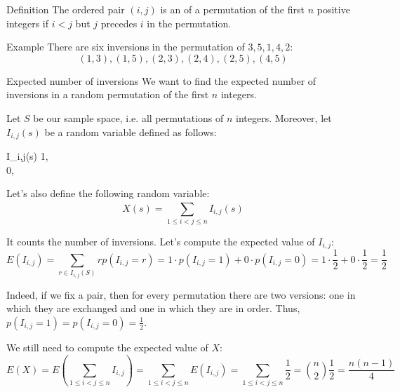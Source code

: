 \documentclass[a4paper]{article}
\begin{document}
\begin{parag}{Definition}
    The ordered pair $\left(i, j\right)$ is an  of a permutation of the first $n$ positive integers if $i < j$ but $j$ precedes $i$ in the permutation.

    \begin{subparag}{Example}
        There are six inversions in the permutation of $3, 5, 1, 4, 2$: 
        \[\left(1, 3\right), \left(1, 5\right), \left(2, 3\right), \left(2, 4\right), \left(2, 5\right), \left(4, 5\right)\]
        
    \end{subparag}
    
\end{parag}

\begin{parag}{Expected number of inversions}
    We want to find the expected number of inversions in a random permutation of the first $n$ integers.

    Let $S$ be our sample space, i.e. all permutations of $n$ integers. Moreover, let $I_{i,j}\left(s\right)$ be a random variable defined as follows: 
    \begin{functionbypart}{I_{i,j}\left(s\right)}
        1, \mathspace {} \\
        0, \mathspace {}
    \end{functionbypart}

    Let's also define the following random variable: 
    \[X\left(s\right) = \sum_{1 \leq i < j \leq n}^{} I_{i,j}\left(s\right)\]
    
    It counts the number of inversions. Let's compute the expected value of $I_{i,j}$: 
    \[E\left(I_{i,j}\right) = \sum_{r \in I_{i, j}\left(S\right)}^{} rp\left(I_{i, j} = r\right) = 1\cdot p\left(I_{i, j} = 1\right) + 0\cdot p\left(I_{i, j} = 0\right) = 1\cdot \frac{1}{2} + 0\cdot \frac{1}{2} = \frac{1}{2}\]
    
    Indeed, if we fix a pair, then for every permutation there are two versions: one in which they are exchanged and one in which they are in order. Thus, $p\left(I_{i, j} = 1\right) = p\left(I_{i, j} = 0\right) = \frac{1}{2}$.

    We still need to compute the expected value of $X$: 
    \[E\left(X\right) = E\left(\sum_{1 \leq i < j \leq n}^{}I_{i,j}\right) = \sum_{1 \leq i < j \leq n}^{} E\left(I_{i,j}\right) = \sum_{1 \leq i < j \leq n}^{} \frac{1}{2} = \binom{n}{2} \frac{1}{2} = \frac{n\left(n-1\right)}{4}\]
\end{parag}
\end{document}
